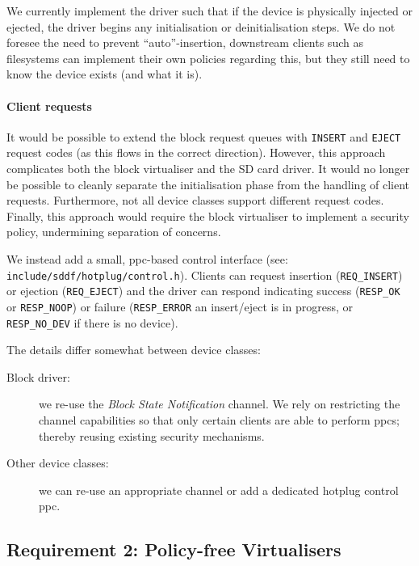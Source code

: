 \documentclass[a4paper,12pt]{report}
\begin{document}
We currently implement the driver such that if the device is
physically injected or ejected, the driver begins any initialisation
or deinitialisation steps. We do not foresee the need to prevent
``auto''-insertion, downstream clients such as filesystems can
implement their own policies regarding this, but they still need to
know the device exists (and what it is).

\paragraph{Client requests}

It would be possible to extend the block request queues with
\texttt{INSERT} and \texttt{EJECT} request codes (as this flows in the
correct direction). However, this approach complicates both the
block virtualiser and the SD card driver. It would no longer be
possible to cleanly separate the initialisation phase from the
handling of client requests. Furthermore, not all device classes
support different request codes. Finally, this approach would require
the block virtualiser to implement a security policy, undermining
separation of concerns.

We instead add a small, \gls{ppc}-based control interface (see:
\texttt{include/sddf/hotplug/control.h}).  Clients can request
insertion (\texttt{REQ\_INSERT}) or ejection (\texttt{REQ\_EJECT}) and
the driver can respond indicating success (\texttt{RESP\_OK} or
\texttt{RESP\_NOOP}) or failure (\texttt{RESP\_ERROR} an insert/eject
is in progress, or \texttt{RESP\_NO\_DEV} if there is no device).

The details differ somewhat between device classes:
\begin{description}
\item[Block driver:] we re-use the \emph{Block State Notification}
  channel. We rely on restricting the channel capabilities so that
  only certain clients are able to perform \gls{ppc}s; thereby reusing
  existing security mechanisms.

\item[Other device classes:] we can re-use an appropriate channel or
  add a dedicated hotplug control \gls{ppc}.
\end{description}

\subsection{Requirement 2: Policy-free Virtualisers}
\end{document}
